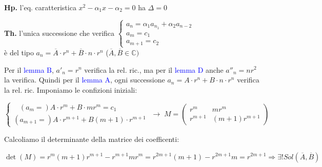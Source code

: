 \begin{flushleft}
\begin{boxA}
        {\centering
            \begin{minipage}[t]{0.25\textwidth}
                \textbf{Hp.} l'eq. caratteristica $x^2-\alpha_1x-\alpha_2 = 0$ ha $\Delta = 0$
            \end{minipage}
            \hfill
            \begin{minipage}[t]{0.65\textwidth}
                \textbf{Th.} l'unica successione che verifica $\begin{cases} 
                    a_n = \alpha_1a_{n_1} + \alpha_2a_{n-2} \\
                    a_m = c_1 \\
                    a_{m+1} = c_2
                \end{cases}$ \\
                è del tipo $a_n = \overline{A} \cdot r^n + \overline{B} \cdot n \cdot r^n $ ($\overline{A}, \overline{B} \in \mathbb{C})$
            \end{minipage}
        \par}
        Per il \textcolor{blue}{lemma B}, $a'_n = r^n$ verifica la rel. ric., ma per il \textcolor{blue}{lemma D} anche $a''_n = nr^2$ la verifica. Quindi per il \textcolor{blue}{lemma A}, ogni successione $a_n = A \cdot r^n + B \cdot n \cdot r^n$ verifica la rel. ric. Imponiamo le confizioni iniziali:

        {\centering
            $\begin{cases}
                \;\;\; (a_m =)A \cdot r^m + B \cdot mr^m = c_1 \\
                (a_{m+1} =)A \cdot r^{m+1} + B (m+1) \cdot r^{m+1}
            \end{cases} \; \rightarrow \; M = \left(\begin{array}{cc} r^m & mr^m \\ r^{m+1} & (m+1) r^{m+1} \end{array}\right)$
        \par}
        Calcoliamo il determinante della matrice dei coefficenti:
        
        {\centering
            $\det(M) = r^m(m+1)r^{m+1} - r^{m+1}mr^m = r^{2m+1}(m+1) - r^{2m+1}m = r^{2m+1} \Rightarrow \exists ! Sol(\overline{A}, \overline{B})$
        \par}
    \end{boxA}
\end{flushleft}

